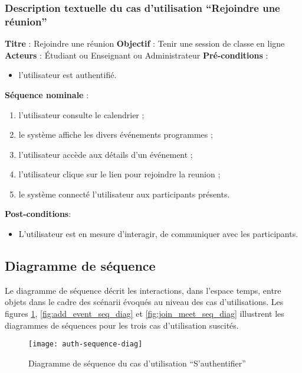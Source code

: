 \subsubsection{Description textuelle du cas d’utilisation “Rejoindre une réunion”}
\textbf{Titre} : Rejoindre une réunion\newline
\textbf{Objectif} : Tenir une session de classe en ligne\newline
\textbf{Acteurs} : Étudiant ou Enseignant ou Administrateur\newline
\textbf{Pré-conditions} : 
\begin{itemize}[noitemsep,topsep=0pt]
  \item l’utilisateur est authentifié.
\end{itemize}
\textbf{Séquence nominale} :
\begin{enumerate}[noitemsep,topsep=0pt]
  \item  l’utilisateur consulte le calendrier ;
	\item le système affiche les divers événements programmes ;
	\item l’utilisateur accède aux détails d’un événement ;
	\item l’utilisateur clique sur le lien pour rejoindre la reunion ;
	\item le système connecté l’utilisateur aux participants présents.
\end{enumerate}
\textbf{Post-conditions}: 
\begin{itemize}[noitemsep,topsep=0pt]
  \item L’utilisateur est en mesure d’interagir, de communiquer avec les participants.
\end{itemize}

\subsection{Diagramme de séquence}
Le diagramme de séquence décrit les interactions, dans l’espace temps, entre objets dans le cadre des scénarii évoqués au niveau des cas d’utilisations. 
Les figures \ref{fig:auth_seq_diag}, \ref{fig:add_event_seq_diag} et \ref{fig:join_meet_seq_diag} illustrent les diagrammes de séquences pour les trois cas d’utilisation suscités.


\begin{figure}[h]
  \centering
  \texttt{[image: auth-sequence-diag]}
  \caption{Diagramme de séquence du cas d'utilisation “S’authentifier”}
  \label{fig:auth_seq_diag}
\end{figure}

